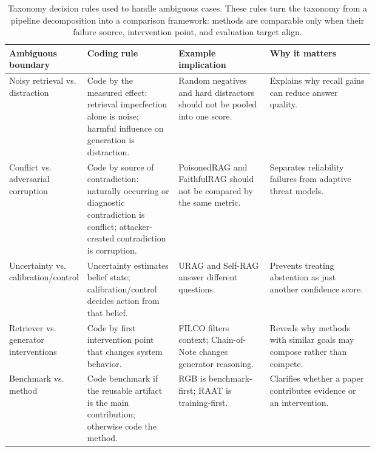 \begin{table}[t]
\centering
\scriptsize
\begin{tabularx}{\linewidth}{p{0.20\linewidth}p{0.25\linewidth}p{0.25\linewidth}X}
\toprule
\textbf{Ambiguous boundary} & \textbf{Coding rule} & \textbf{Example implication} & \textbf{Why it matters} \\
\midrule
Noisy retrieval vs. distraction & Code by the measured effect: retrieval imperfection alone is noise; harmful influence on generation is distraction. & Random negatives and hard distractors should not be pooled into one score. & Explains why recall gains can reduce answer quality. \\
Conflict vs. adversarial corruption & Code by source of contradiction: naturally occurring or diagnostic contradiction is conflict; attacker-created contradiction is corruption. & PoisonedRAG and FaithfulRAG should not be compared by the same metric. & Separates reliability failures from adaptive threat models. \\
Uncertainty vs. calibration/control & Uncertainty estimates belief state; calibration/control decides action from that belief. & URAG and Self-RAG answer different questions. & Prevents treating abstention as just another confidence score. \\
Retriever vs. generator interventions & Code by first intervention point that changes system behavior. & FILCO filters context; Chain-of-Note changes generator reasoning. & Reveals why methods with similar goals may compose rather than compete. \\
Benchmark vs. method & Code benchmark if the reusable artifact is the main contribution; otherwise code the method. & RGB is benchmark-first; RAAT is training-first. & Clarifies whether a paper contributes evidence or an intervention. \\
\bottomrule
\end{tabularx}
\caption{Taxonomy decision rules used to handle ambiguous cases. These rules turn the taxonomy from a pipeline decomposition into a comparison framework: methods are comparable only when their failure source, intervention point, and evaluation target align.}
\label{tab:taxonomy-rules}
\end{table}

